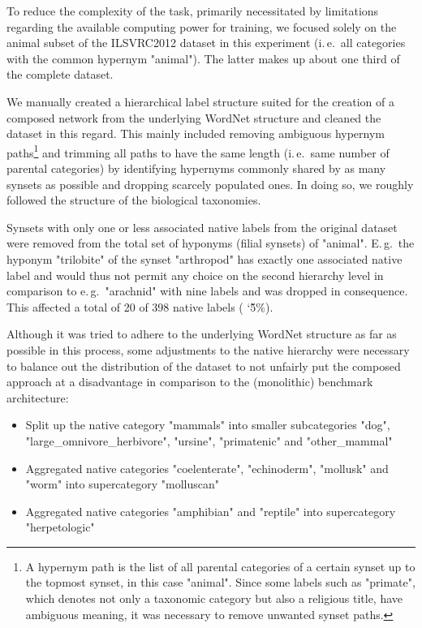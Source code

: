 To reduce the complexity of the task, primarily necessitated by limitations regarding the available computing power for training, we focused solely on the animal subset of the ILSVRC2012 dataset in this experiment (i.\,e.\ all categories with the common hypernym "animal"). The latter makes up about one third of the complete dataset.

We manually created a hierarchical label structure suited for the creation of a composed network from the underlying WordNet structure and cleaned the dataset in this regard. This mainly included removing ambiguous hypernym paths\footnote{A hypernym path is the list of all parental categories of a certain synset up to the topmost synset, in this case "animal". Since some labels such as "primate", which denotes not only a taxonomic category but also a religious title, have ambiguous meaning, it was necessary to remove unwanted synset paths.} and trimming all paths to have the same length (i.\,e.\ same number of parental categories) by identifying hypernyms commonly shared by as many synsets as possible and dropping scarcely populated ones. In doing so, we roughly followed the structure of the biological taxonomies.

Synsets with only one or less associated native labels from the original dataset were removed from the total set of hyponyms (filial synsets) of "animal". E.\,g.\ the hyponym "trilobite" of the synset "arthropod" has exactly one associated native label and would thus not permit any choice on the second hierarchy level in comparison to e.\,g.\ "arachnid" with nine labels and was dropped in consequence. This affected a total of 20 of 398 native labels (\char
`\~5\%).

Although it was tried to adhere to the underlying WordNet structure as far as possible in this process, some adjustments to the native hierarchy were necessary to balance out the distribution of the dataset to not unfairly put the composed approach at a disadvantage in comparison to the (monolithic) benchmark architecture:

\begin{itemize}
    \item Split up the native category "mammals" into smaller subcategories "dog", \\ "large\_omnivore\_herbivore", "ursine", "primatenic" and "other\_mammal"
    \item Aggregated native categories "coelenterate", "echinoderm", "mollusk" and "worm" into supercategory "molluscan"
    \item Aggregated native categories "amphibian" and "reptile" into supercategory "herpetologic"
\end{itemize}
 

